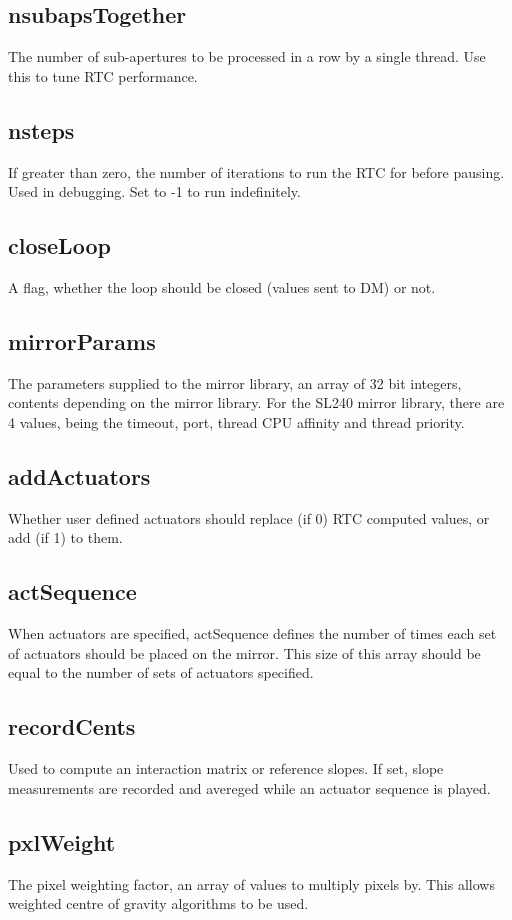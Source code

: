 \documentclass[a4,10pt]{article}
\begin{document}
\subsection{nsubapsTogether}
The number of sub-apertures to be processed in a row by a single
thread.  Use this to tune RTC performance.

\subsection{nsteps}
If greater than zero, the number of iterations to run the RTC for
before pausing.  Used in debugging.  Set to -1 to run indefinitely.

\subsection{closeLoop}
A flag, whether the loop should be closed (values sent to DM) or not.

\subsection{mirrorParams}
The parameters supplied to the mirror library, an array of 32 bit
integers, contents depending on the mirror library.  For the SL240
mirror library, there are 4 values, being the timeout, port, thread
CPU affinity and thread priority.

\subsection{addActuators}
Whether user defined actuators should replace (if 0) RTC computed
values, or add (if 1) to them.

\subsection{actSequence}
When actuators are specified, actSequence defines the number of times
each set of actuators should be placed on the mirror.  This size of
this array should be equal to the number of sets of actuators
specified.

\subsection{recordCents}
Used to compute an interaction matrix or reference slopes.  If set,
slope measurements are recorded and avereged while an actuator
sequence is played.

\subsection{pxlWeight}
The pixel weighting factor, an array of values to multiply pixels by.
This allows weighted centre of gravity algorithms to be used.
\end{document}
